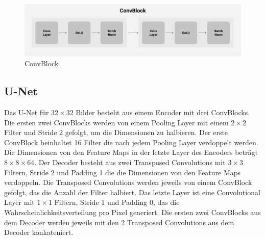 \begin{figure}[H]
  \centering
  \includegraphics[width=1\textwidth]{resources/networks/convblock.png}
  \caption{
  ConvBlock
  }
  \label{image:convBlock}
\end{figure}

\subsection{U-Net}
Das U-Net für $32 \times 32$ Bilder besteht aus einem Encoder mit drei ConvBlocks. Die ersten zwei ConvBlocks werden von einem Pooling Layer
mit einem $2 \times 2$ Filter und Stride 2 gefolgt, um die Dimensionen zu halbieren. 
Der erste ConvBlock beinhaltet 16 Filter die nach jedem Pooling Layer verdoppelt werden. Die Dimensionen von den Feature Maps in der letzte
Layer des Encoders beträgt $8 \times 8 \times 64$. Der Decoder besteht aus zwei Transposed Convolutions mit $3 \times 3$ Filtern, Stride 2 und 
Padding 1 die die Dimensionen von den Feature Maps verdoppeln. Die Transposed Convolutions werden jeweils von einem ConvBlock gefolgt, das die
Anzahl der Filter halbiert. Das letzte Layer ist eine Convolutional Layer mit $1 \times 1$ Filtern, Stride 1 und Padding 0, das die 
Wahrscheinlichkeitsverteilung pro Pixel generiert. Die ersten zwei ConvBlocks aus dem Decoder werden jeweils mit den 2 Transposed Convolutions
aus dem Decoder konkateniert.
